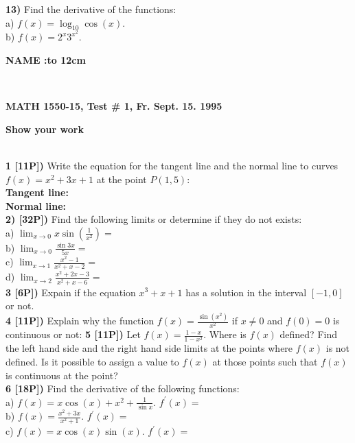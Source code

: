 \documentclass[12pt]{article}
\begin{document}
{\bf 13)} Find the derivative of the functions:
\\ %
a) $\displaystyle{f(x) = \log_{10} \cos (x)}$.
\\
b) $\displaystyle{f(x)= 2^x3^{x^2}}$.
\centerline{\large\bf NAME :\hbox to 12cm{\hrulefill}}
\\ %
\centerline{\bf MATH 1550-15, Test \# 1, Fr. Sept. 15. 1995}
\centerline{\bf Show your work}
\\ %
{\bf 1 [11P])}  Write the equation for the tangent line and the normal line
to curves
$\displaystyle{f(x) = x^2+3x + 1}$ at the
point $\displaystyle{P(1,5)}$:
\\ %
{\bf Tangent line: }
\\ %
{\bf Normal line: }
\\ %
{\bf 2) [32P])}  Find the following limits or determine if they do not exists:
\\
a) $\displaystyle{\lim_{x\to 0}x\sin \left(\frac{1}{x^2}\right)=}$
\\ %
b) $\displaystyle{\lim_{x\to 0}\frac{\sin 3x}{5x}=}$
\\ %
c) $\displaystyle{\lim_{x\to 1}\frac{x^2-1}{x^2+x-2}=}$
\\ %
d) $\displaystyle{\lim_{x\to 2}\frac{x^2+2x-3}{x^2+x-6}=}$
\\ %
{\bf 3 [6P])}  Expain if the equation $\displaystyle{x^3+x + 1}$ has a solution in the
interval $[-1,0]$ or not.
\\ %
{\bf 4 [11P])} Explain why the function
$\displaystyle{f(x) = \frac{\sin (x^2)}{x^2}}$ if $x\not= 0$ and $f(0) = 0$ is continuous or
not:
{\bf 5 [11P])}  Let $\displaystyle{f(x) = \frac{1-x}{1-x^2}}$. Where
is $f(x)$ defined?  Find the left hand side and the right hand side limits at the
points where $f(x)$ is not defined. Is it possible to assign a value to $f(x)$ at
those points such that $f(x)$ is continuous at the point?
\\ %
{\bf 6 [18P])} Find the derivative of the following functions:
\\ %
a) $\displaystyle{f(x) = x\cos (x) + x^2 + \frac{1}{\sin x}}$. $\displaystyle{f^\prime(x) = }$
\\ %
b) $\displaystyle{f(x) = \frac{x^2 + 3x}{x^2+1}}$.
$\displaystyle{f^\prime(x) = }$
\\ %
c) $\displaystyle{f(x) = x\cos (x) \sin (x)}$. $\displaystyle{f^\prime(x) = }$
\end{document}
